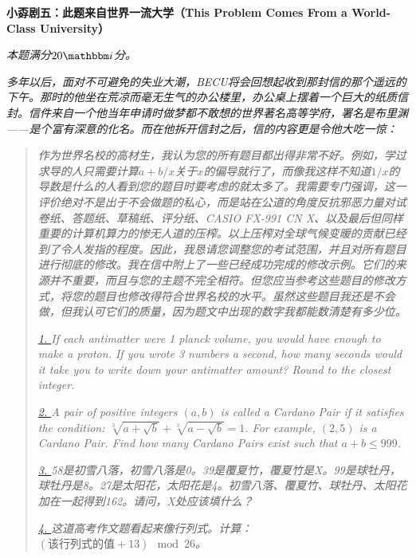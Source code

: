 \documentclass[11pt,a4paper,onecolumn,UTF8]{ctexart}
\begin{document}
	
	
	
	
	\newpage
	\noindent
	\textbf{小孬剧五：此题来自世界一流大学（This Problem Comes From a World-Class University）}
	
	\textit{本题满分$20\ui$分。}
	
	\textit{多年以后，面对不可避免的失业大潮，{\color{white}BECU}将会回想起收到那封信的那个遥远的下午。那时的他坐在荒凉而毫无生气的办公楼里，办公桌上摆着一个巨大的纸质信封。信件来自一个他当年申请时做梦都不敢想的世界著名高等学府，署名是布里渊——是个富有深意的化名。而在他拆开信封之后，信的内容更是令他大吃一惊：}
	
	\begin{quote}
		
		\textit{作为世界名校的高材生，我认为您的所有题目都出得非常不好。例如，学过求导的人只需要计算$a+b/x$关于$x$的偏导就行了，而像我这样不知道$1/x$的导数是什么的人看到您的题目时要考虑的就太多了。我需要专门强调，这一评价绝对不是出于不会做题的私心，而是站在公道的角度反抗邪恶力量对试卷纸、答题纸、草稿纸、评分纸、CASIO FX-991 CN X、以及最后但同样重要的计算机算力的惨无人道的压榨。以上压榨对全球气候变暖的贡献已经到了令人发指的程度。因此，我恳请您调整您的考试范围，并且对所有题目进行彻底的修改。我在信中附上了一些已经成功完成的修改示例。它们的来源并不重要，而且与您的主题不完全相符。但您应当参考这些题目的修改方式，将您的题目也修改得符合世界名校的水平。虽然这些题目我还是不会做，但我认可它们的质量，因为题文中出现的数字我都能数清楚有多少位。}
		
		\textit{\href{https://antimatter-dimensions.fandom.com/wiki/Statistics}{1. }If each antimatter were 1 planck volume, you would have enough to make a proton. If you wrote 3 numbers a second, how many seconds would it take you to write down your antimatter amount? Round to the closest integer.}
		
		\textit{\href{https://projecteuler.net/problem=251}{2. }A pair of positive integers $(a, b)$ is called a Cardano Pair if it satisfies the condition: $\sqrt[3]{a + \sqrt{b}} + \sqrt[3]{a - \sqrt{b}} = 1$. For example, $(2,5)$ is a Cardano Pair. Find how many Cardano Pairs exist such that $a + b \le 999$.}
		
		\textit{\href{https://www.bilibili.com/opus/789540243384565766}{3. }58是初雪八落，初雪八落是0。39是覆夏竹，覆夏竹是X。99是球牡丹，球牡丹是8。27是太阳花，太阳花是4。初雪八落、覆夏竹、球牡丹、太阳花加在一起得到162。请问，X处应该填什么？}
		
		\textit{\href{https://pnku3.pkupuzzle.art/puzzle?key=day3_09}{4. }这道高考作文题看起来像行列式。计算：$(\text{该行列式的值}+13)\mod 26$。}
		

\end{quote}
\end{document}
